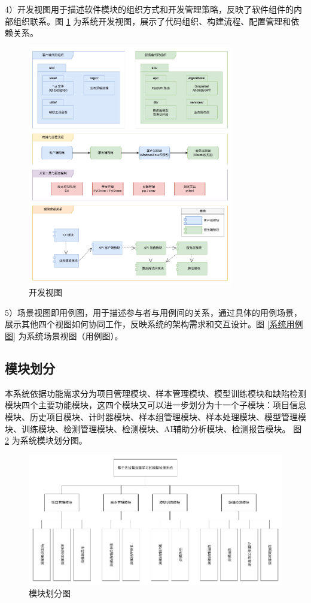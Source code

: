 \documentclass[
  ]{njuthesis}
\begin{document}
4）开发视图用于描述软件模块的组织方式和开发管理策略，反映了软件组件的内部组织联系。图 \ref{开发视图} 为系统开发视图，展示了代码组织、构建流程、配置管理和依赖关系。

\begin{figure}[H]
    \centering
    \includegraphics[width=0.8\textwidth]{images/开发视图.png}
    \caption{开发视图}
    \label{开发视图}
\end{figure}

5）场景视图即用例图，用于描述参与者与用例间的关系，通过具体的用例场景，展示其他四个视图如何协同工作，反映系统的架构需求和交互设计。图 \ref{系统用例图} 为系统场景视图（用例图）。

\subsection{模块划分}

本系统依据功能需求分为项目管理模块、样本管理模块、模型训练模块和缺陷检测模块四个主要功能模块，这四个模块又可以进一步划分为十一个子模块：项目信息模块、历史项目模块、计时器模块、样本组管理模块、样本处理模块、模型管理模块、训练模块、检测管理模块、检测模块、AI辅助分析模块、检测报告模块。
图 \ref{模块划分图} 为系统模块划分图。

\begin{figure}[htb]
    \centering
    \includegraphics[width=\textwidth]{images/模块划分图.png}
    \caption{模块划分图}
    \label{模块划分图}
\end{figure}
\end{document}
